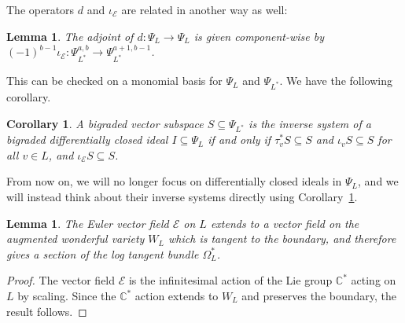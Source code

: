 \documentclass{amsart}
\newtheorem{lemma}[theorem]{Lemma}
\newtheorem{corollary}[theorem]{Corollary}
\newcommand{\F}{\mathbb{C}}
\theoremstyle{definition}
\begin{document}
The operators $d$ and $\iota_{\mathcal{E}}$ are related in another way 
as well:
\begin{lemma}
    The adjoint of $d \colon \Psi_L \to \Psi_L$ 
    is given component-wise by $(-1)^{b-1}\iota_{\mathcal{E}} \colon 
    \Psi_{L^*}^{a,b} \to \Psi_{L^*}^{a+1,b-1}$. 
\end{lemma}

This can be checked on a monomial basis for $\Psi_L$ and $\Psi_{L^*}$. 
We have the following corollary.
\begin{corollary}\label{d-closed-inverse-char}
    A bigraded vector subspace $S \subseteq \Psi_{L^*}$ is the 
inverse system of a bigraded differentially closed ideal $I \subseteq 
\Psi_L$ if and only if $\tau_v^* S \subseteq S$ and $\iota_v S \subseteq 
S$ for all $v \in L$, and $\iota_{\mathcal{E}} S \subseteq S$.
\end{corollary}

From now on, we will no longer focus on differentially closed ideals in 
$\Psi_L$, and we will instead think about their inverse systems 
directly using Corollary~\ref{d-closed-inverse-char}.

\begin{lemma}\label{lem:eulertangent}
    The Euler vector field $\mathcal{E}$ on $L$ extends to a vector field on 
    the augmented wonderful variety $W_L$ which is tangent to the 
    boundary, and therefore gives a section of the log tangent bundle $\Omega_{L}^*$.
\end{lemma}
\begin{proof}
    The vector field $\mathcal{E}$ is the infinitesimal action of the 
    Lie group $\F^*$ acting on $L$ by scaling. Since the $\F^*$ action 
    extends to $W_L$ and preserves the boundary, the result follows.
\end{proof}
\end{document}
